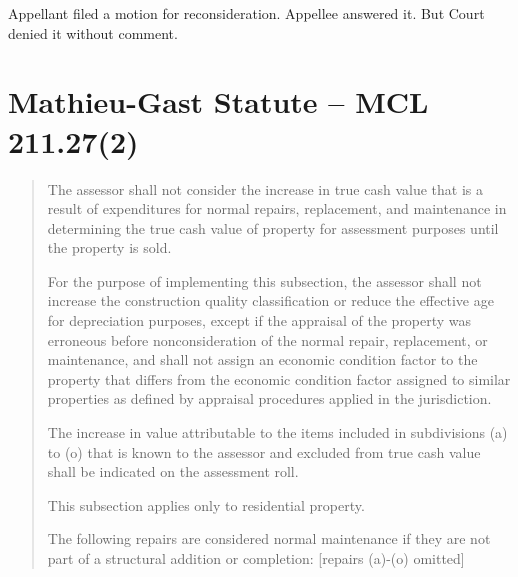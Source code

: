 \documentclass[12pt,\documentclassflag]{michiganCourtOfAppealsBrief}
\begin{document}
Appellant filed a motion for reconsideration. Appellee answered it. But Court denied it without comment.


\section{Mathieu-Gast Statute -- MCL 211.27(2)}
\begin{quotation}
The assessor shall not consider the increase in true cash value that is a result of expenditures for normal repairs, replacement, and maintenance in determining the true cash value of property for assessment purposes until the property is sold.

For the purpose of implementing this subsection, the assessor shall not increase the construction quality classification or reduce the effective age for depreciation purposes, except if the appraisal of the property was erroneous before nonconsideration of the normal repair, replacement, or maintenance, and shall not assign an economic condition factor to the property that differs from the economic condition factor assigned to similar properties as defined by appraisal procedures applied in the jurisdiction.

The increase in value attributable to the items included in subdivisions (a) to (o) that is known to the assessor and excluded from true cash value shall be indicated on the assessment roll.

This subsection applies only to residential property.

The following repairs are considered normal maintenance if they are not part of a structural addition or completion: [repairs (a)-(o) omitted]

\end{quotation}
\end{document}
